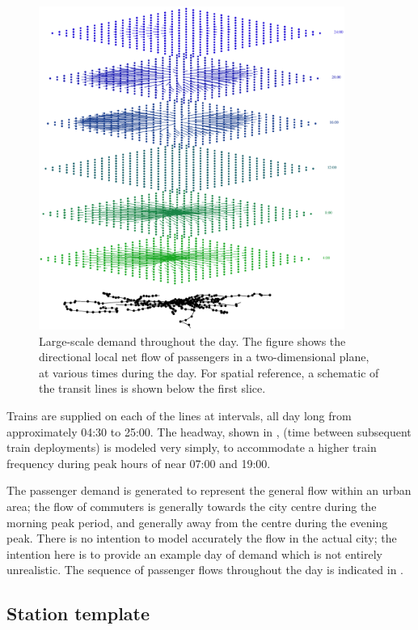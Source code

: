 \begin{figure}[ht]
  \centering
  \includegraphics[angle=0,width=10cm]{70_figs/_SystemFlows.eps}
    \caption{Large-scale demand throughout the day.
      The figure shows the directional local net flow of passengers in a two-dimensional plane,
      at various times during the day. For spatial reference, a schematic of the
      transit lines is shown below the first slice. }        
  \label{demandinday}
\end{figure}
  
Trains are supplied on each of the lines at intervals, all day long
from approximately 04:30 to 25:00. The headway, shown in
, (time between subsequent train deployments) is modeled
very simply, to accommodate a higher train frequency during peak hours
of near 07:00 and 19:00.

The passenger demand is generated to represent the general flow within
an urban area; the flow of commuters is generally towards the city
centre during the morning peak period, and generally away from the
centre during the evening peak. There is no intention to model accurately the
flow in the actual city; the intention here is to provide an example day of
demand which is not entirely unrealistic. The sequence of passenger
flows throughout the day is indicated in .

\subsection{Station template}

